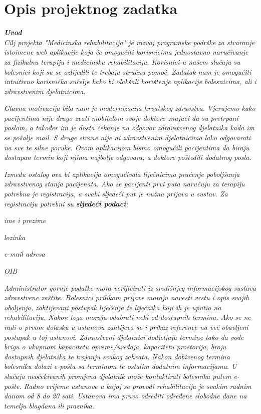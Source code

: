 \chapter{Opis projektnog zadatka}
		
		\textbf{\textit{Uvod}}\\
		
		\textit{Cilj projekta "Medicinska rehabilitacija" je razvoj programske podrške za stvaranje istoimene web aplikacije koja će omogućiti korisnicima jednostavno naručivanje za fizikalnu terapiju i medicinsku rehabilitaciju. Korisnici u našem slučaju su bolesnici koji su se ozlijedili te trebaju stručnu pomoć. Zadatak nam je omogućiti intuitivno korisničko sučelje kako bi olakšali korištenje aplikacije bolesnicima, ali i zdravstvenim djelatnicima.}
		
		\textit{Glavna motivacija bila nam je modernizacija hrvatskog zdravstva. Vjerujemo kako pacijentima nije drago zvati mobitelom svoje doktore znajući da su pretrpani poslom, a također im je dosta čekanje na odgovor zdravstvenog djelatnika kada im se pošalje mail. S druge strane nije ni zdravstvenim djelatnicima lako odgovarati na sve te silne poruke. Ovom aplikacijom bismo omogućili pacijentima da biraju dostupan termin koji njima najbolje odgovara, a doktore poštedili dodatnog posla.}
		
		\textit{Između ostalog ova bi aplikacija omogućivala liječnicima praćenje poboljšanja zdravstvenog stanja pacijenata. Ako se pacijenti prvi puta naručuju za terapiju potrebna je registracija, a svaki sljedeći put je nužna prijava u sustav. Za registraciju potrebni su \textbf{sljedeći podaci}: }
		\begin{packed_item}
			\item \textit{ime i prezime}
			\item \textit{lozinka}
			\item \textit{e-mail adresa}
			\item \textit{OIB}
		\end{packed_item}
		
		\textit{Administrator gornje podatke mora verificirati iz središnjeg informacijskog sustava zdravstvene zaštite. Bolesnici prilikom prijave moraju navesti vrstu i opis svojih oboljenja, zahtijevani postupak liječenja te liječnika koji ih je uputio na rehabilitaciju. Nakon toga moraju odabrati neki od dostupnih termina. Ako se ne radi o prvom dolasku u ustanovu zahtijeva se i prikaz reference na već obavljeni postupak u toj ustanovi. Zdravstveni djelatnici dodjeljuju termine tako da vode brigu o ukupnom kapacitetu opreme/uređaja, kapacitetu prostorija, broju dostupnih djelatnika te trajanju svakog zahvata. Nakon dobivenog termina bolesniku dolazi e-pošta sa terminom te ostalim dodatnim informacijama. U slučaju neočekivanih promjena djelatnik može kontaktirati bolesnika putem e-pošte. Radno vrijeme ustanove u kojoj se provodi rehabilitacija je svakim radnim danom od 8 do 20 sati. Ustanova ima pravo odrediti određene slobodne dane na temelju blagdana ili praznika.}\\
		
